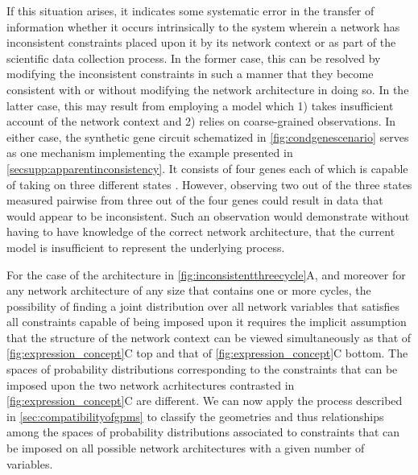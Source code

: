 If this situation arises, it indicates some systematic error in the transfer of information whether it occurs intrinsically to the system wherein a network has inconsistent constraints placed upon it by its network context or as part of the scientific data collection process. In the former case, this can be resolved by modifying the inconsistent constraints in such a manner that they become consistent with or without modifying the network architecture in doing so. In the latter case, this may result from employing a model which 1) takes insufficient account of the network context and 2) relies on coarse-grained observations. In either case, the synthetic gene circuit schematized in \ref{fig:condgenescenario} serves as one mechanism implementing the example presented in  \ref{secsupp:apparentinconsistency}. It consists of four genes each of which is capable of taking on three different states \cite{Rieckh2013a}. However, observing two out of the three states measured pairwise from three out of the four genes could result in data that would appear to be inconsistent. Such an observation would demonstrate without having to have knowledge of the correct network architecture, that the current model is insufficient to represent the underlying process.

For the case of the architecture in \ref{fig:inconsistentthreecycle}A, and moreover for any network architecture of any size that contains one or more cycles, the possibility of finding a joint distribution over all network variables that satisfies all constraints capable of being imposed upon it requires the implicit assumption that the structure of the network context can be viewed simultaneously as that of \ref{fig:expression_concept}C top and that of \ref{fig:expression_concept}C bottom. The spaces of probability distributions corresponding to the constraints that can be imposed upon the two network acrhitectures contrasted in \ref{fig:expression_concept}C are different. We can now apply the process described in \ref{sec:compatibilityofgpms} to classify the geometries and thus relationships among the spaces of probability distributions associated to constraints that can be imposed on all possible network architectures with a given number of variables.

